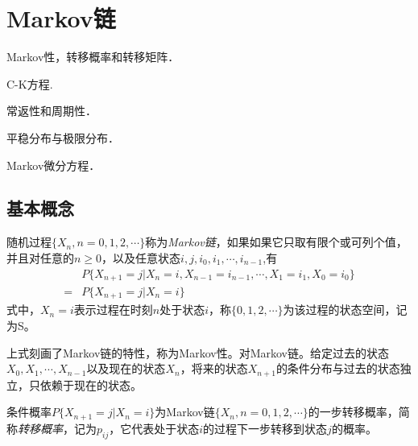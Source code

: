 
\chapter{Markov链}

\begin{compactitem}
	\item Markov性，转移概率和转移矩阵．
	\item C-K方程.
	\item 常返性和周期性．
	\item 平稳分布与极限分布．
	\item Markov微分方程．
\end{compactitem}

\section{基本概念}\label{sec:BisCon}

\begin{definition}\label{def:Markov}
	随机过程\(\{X_n,n=0,1,2,\cdots\}\)称为\emph{Markov链}，如果如果它只取有限个或可列个值，并且对任意的\(n\geqslant 0\)，以及任意状态\(i,j,i_0,i_1,\cdots,i_{n-1}\),有
	\begin{align*}
		  & P\{X_{n+1}=j|X_n=i,X_{n-1}=i_{n-1},\cdots,X_1=i_1,X_0=i_0\} \\
		= & P\{X_{n+1}=j|X_n=i\}
	\end{align*}
	式中，\(X_n=i\)表示过程在时刻\(n\)处于状态\(i\)，称\(\{0,1,2,\cdots\}\)为该过程的状态空间，记为S。
\end{definition}

上式刻画了Markov链的特性，称为Markov性。对Markov链。给定过去的状态\(X_0,X_1,\cdots,X_{n-1}\)以及现在的状态\(X_n\)，将来的状态\(X_{n+1}\)的条件分布与过去的状态独立，只依赖于现在的状态。

\begin{definition}\label{def:ProbTran}
	条件概率\(P\{X_{n+1}=j|X_n=i\}\)为Markov链\(\{X_n,n=0,1,2,\cdots\}\)的一步转移概率，简称\emph{转移概率}，记为\(p_{ij}\)，它代表处于状态\(i\)的过程下一步转移到状态\(j\)的概率。
\end{definition}

